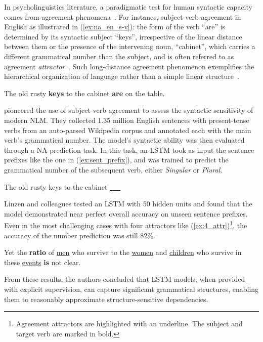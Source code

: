 In psycholinguistics literature, a paradigmatic test for human syntactic capacity comes from agreement phenomena~\citep{bockRegulatingMentalEnergy1992, BOCK199145, bockAttractionsVerbAgreement2001}. For instance, subject-verb agreement in English as illustrated in (\ref{ex:na_en_s-v}): the form of the verb ``are'' is determined by its syntactic subject ``keys'', irrespective of the linear distance between them or the presence of the intervening noun, ``cabinet'', which carries a different grammatical number than the subject, and is often referred to as agreement \textit{attractor}~\citep{BOCK199145}. Such long-distance agreement phenomenon exemplifies the hierarchical organization of language rather than a simple linear structure~\citep{everaert2015}.

\setcounter{exx}{0} %
\begin{exe}
   \ex\label{ex:na_en_s-v}
The old rusty \textbf{keys} to the cabinet \textbf{are} on the table.
\end{exe}

\cite{linzen-etal-2016-assessing} pioneered the use of subject-verb agreement to assess the syntactic sensitivity of modern NLM. They collected 1.35 million English sentences with present-tense verbs from an auto-parsed Wikipedia corpus and annotated each with the main verb's grammatical number. The model's syntactic ability was then evaluated through a \ac{NA} prediction task. In this task, an LSTM took as input the sentence prefixes like the one in (\ref{ex:sent_prefix}), and was trained to predict the grammatical number of the subsequent verb, either \textit{Singular} or \textit{Plural}.

\vspace{-0.5\baselineskip}
\begin{exe}
   \ex\label{ex:sent_prefix}
The old rusty keys to the cabinet \underline{\ \ \ }
\end{exe}
\vspace{-0.5\baselineskip} 
Linzen and colleagues tested an LSTM with 50 hidden units and found that the model demonstrated near perfect overall accuracy on unseen sentence prefixes. Even in the most challenging cases with four attractors like  (\ref{ex:4_attr})\footnote{Agreement attractors are highlighted with an underline. The subject and target verb are marked in bold.}, the accuracy of the number prediction was still 82\%. 
\vspace{-0.5\baselineskip}
\begin{exe}
   \ex\label{ex:4_attr}
Yet the \textbf{ratio} of \underline{men} who survive to the \underline{women} and \underline{children} who survive in these \underline{events} \textbf{is} not clear. 
\end{exe}
\vspace{-0.5\baselineskip}
From these results, the authors concluded that LSTM models, when provided with explicit supervision, can capture significant grammatical structures, enabling them to reasonably approximate structure-sensitive dependencies.

